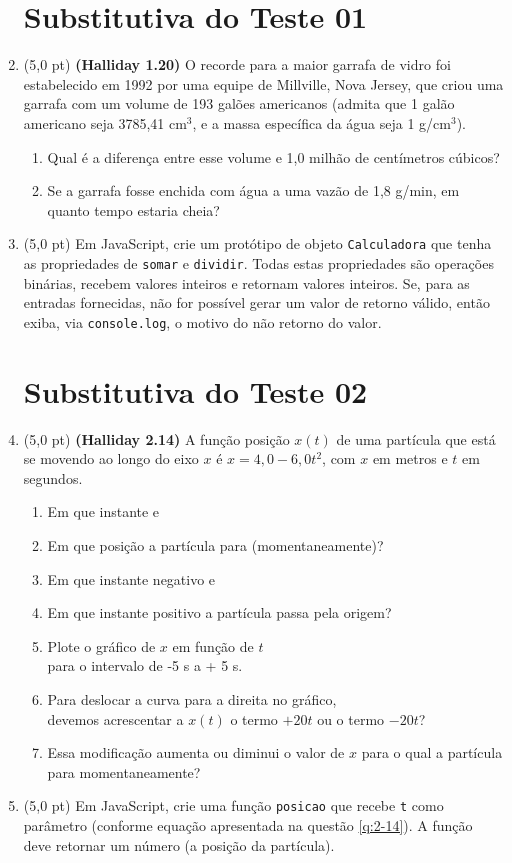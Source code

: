 \documentclass[12pt,a4paper,oneside]{article}
\begin{document}
\begin{enumerate}
	
	\section*{Substitutiva do Teste 01}

	\item (5,0 pt) {\bf (Halliday 1.20)} O recorde para a maior garrafa de vidro foi estabelecido em 1992 por uma equipe de Millville, Nova Jersey, que criou uma garrafa com um volume de 193 galões americanos (admita que 1 galão americano seja 3785,41 cm$^3$, e a massa específica da água seja 1 g/cm$^3$).
		\begin{enumerate}
			\item Qual é a diferença entre esse volume e 1,0 milhão de centímetros cúbicos?
			\item Se a garrafa fosse enchida com água a uma vazão de 1,8 g/min, em quanto tempo estaria cheia? 
		\end{enumerate}
	
	
	\item (5,0 pt) Em JavaScript, crie um protótipo de objeto {\tt Calculadora} que tenha as propriedades de {\tt somar} e {\tt dividir}. Todas estas propriedades são operações binárias, recebem valores inteiros e retornam valores inteiros. Se, para as entradas fornecidas, não for possível gerar um valor de retorno válido, então exiba, via {\tt console.log}, o motivo do não retorno do valor.
	
	\section*{Substitutiva do Teste 02}
	
	\item (5,0 pt) {\bf (Halliday 2.14)} A função posição $x(t)$ de uma partícula que está se movendo ao longo do eixo $x$ é $x = 4,0 - 6,0t^2$, com $x$ em metros e $t$ em segundos. \label{q:2-14}
	\begin{enumerate}
		\item Em que instante e
		\item Em que posição a partícula para (momentaneamente)?
		\item Em que instante negativo e
		\item Em que instante positivo a partícula passa pela origem?
		\item Plote o gráfico de $x$ em função de $t$ \\
		para o intervalo de -5 s a + 5 s.
		\item Para deslocar a curva para a direita no gráfico,\\ devemos acrescentar a $x(t)$ o termo $+20t$ ou o termo $-20t$?
		\item Essa modificação aumenta ou diminui o valor de $x$ para o qual a partícula para momentaneamente?
	\end{enumerate}

	\item (5,0 pt) Em JavaScript, crie uma função {\tt posicao} que recebe {\tt t} como parâmetro (conforme equação apresentada na questão \ref{q:2-14}). A função deve retornar um número (a posição da partícula).
	
	\end{enumerate}
\end{document}
